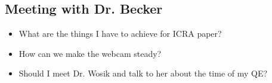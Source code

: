 \subsection{Meeting with Dr. Becker  }

\begin{itemize}
\item What are the things I have to achieve for ICRA paper? 
\item How can we make the webcam steady? 
\item Should I meet Dr. Wosik and talk to her about the time of my QE?
\end{itemize}


